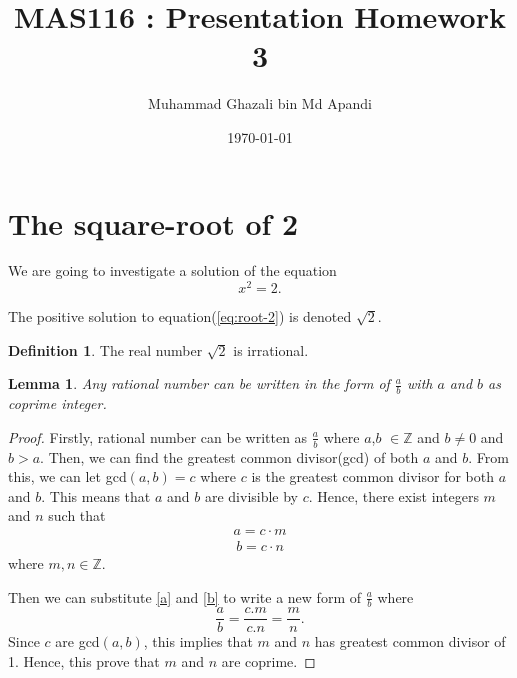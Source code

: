 \documentclass[11pt, a4]{amsart}
\author{Muhammad Ghazali bin Md Apandi}
\title{MAS116 : Presentation Homework 3}
\date{\today}
\newtheorem{lem}[thm]{Lemma}
\theoremstyle{definition}
\newtheorem{defn}[thm]{Definition}
\begin{document}
\maketitle

\section{The square-root of 2}


We are going to investigate a solution of the
equation
\begin{equation}
\label{eq:root-2}
	x^2=2.
\end{equation}

The positive solution to equation(\ref{eq:root-2}) is denoted $\sqrt{2}$.
\begin{defn}
	The real number $\sqrt{2}$ is irrational.
\end{defn}

\begin{lem}
	Any rational number can be written in the form of $\frac{a}{b}$ with $a$ and $b$ as coprime integer.
\end{lem}

\begin{proof}
	Firstly, rational number can be written as $\frac{a}{b}$ where $a$,$b$ $\in \mathbb{Z}$ and $b \neq 0$ and $b > a$. Then, we can find the greatest common divisor(gcd) of both $a$ and $b$. From this, we can let gcd$(a,b) = c$ where $c$ is the greatest common divisor for both $a$ and $b$. This means that $a$ and $b$ are divisible by $c$. Hence, there exist integers $m$ and $n$ such that 
	\begin{align}
	\label{a}
	a = c \cdot m 
	\end{align}
	\begin{align}
	\label{b}
	b = c \cdot n
	\end{align}
	where $m,n \in \mathbb{Z}$.
	
	Then we can substitute \ref{a} and \ref{b} to write a new form of $\frac{a}{b}$ where
	\begin{equation}
	\frac{a}{b} = \frac{c.m}{c.n} = \frac{m}{n}.
	\end{equation}
	Since $c$ are gcd$(a,b)$, this implies that $m$ and $n$ has greatest common divisor of 1. Hence, this prove that $m$ and $n$ are coprime.
\end{proof}
\end{document}
